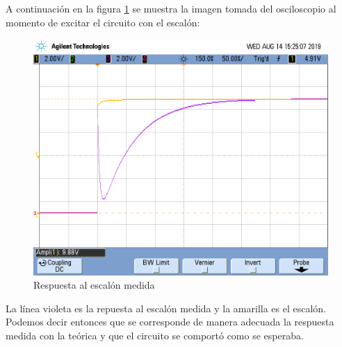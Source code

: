 \documentclass[12pt,a4paper]{article}
\begin{document}


A continuación en la figura \ref{rtaalescalonosciloscopio} se muestra la imagen tomada del osciloscopio al momento de excitar el circuito con el escalón:

\begin{figure}[H]                                                       
    \centering\includegraphics[width=\textwidth]{rtaalescalon.png}
    \caption{Respuesta al escalón medida}
\label{rtaalescalonosciloscopio}
\end{figure}

La línea violeta es la repuesta al escalón  medida y la amarilla es el escalón. Podemos decir entonces  que se corresponde de manera adecuada la respuesta medida con la teórica y que el circuito se comportó como se esperaba.
 
\end{document}
